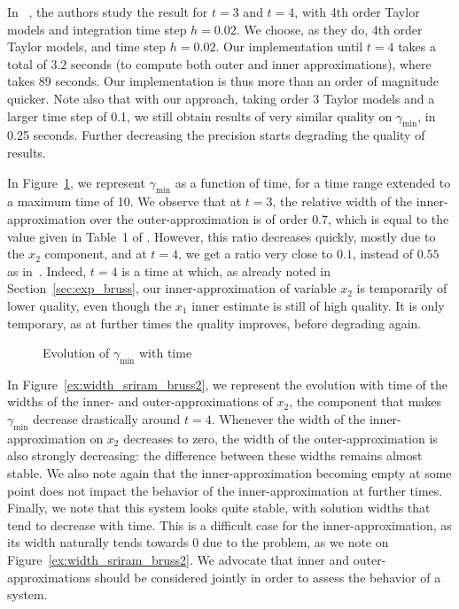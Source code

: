 \documentclass{sig-alternate-05-2015}
\begin{document}
In ~\cite{Underapproxflowpipes}, the authors study the result for $t=3$ and $t=4$, with 4th order Taylor models and integration time step $h=0.02$. 
We choose, as they do, 4th order Taylor models,  and time step $h=0.02$. Our implementation until $t=4$
takes a total of $3.2$ seconds (to compute both outer and inner approximations), where \cite{Underapproxflowpipes} takes 89 seconds.
Our implementation is thus more than an order of magnitude quicker.
Note also that with our approach, taking order 3 Taylor models and a larger time step of 0.1, we still obtain results of very similar quality on $\gamma_{\min}$, in 0.25 seconds. 
Further decreasing the precision starts degrading the quality of results. 



In Figure~\ref{ex:width_sriram_bruss1},  we represent $\gamma_{\min}$ as a function of time, for a  time range 
extended to a maximum time of 10. 
We observe that at $t=3$, the relative width of the inner-approximation over the
outer-approximation is of order $0.7$, which is equal to the value given in Table~1 of \cite{Underapproxflowpipes}. 
However, this ratio decreases quickly, mostly due to the $x_2$ component, and at $t=4$, we get a ratio very close to $0.1$,
instead of $0.55$ as in~\cite{Underapproxflowpipes}. Indeed, $t=4$ is a time at which, as already noted in Section~\ref{sec:exp_bruss}, our 
inner-approximation of variable $x_2$ is temporarily of lower quality, even though the $x_1$ inner estimate
is still of high quality. It is only temporary, as at further times the quality  improves, before degrading again. 
\begin{figure}[htbp]
\begin{center}
\end{center}
\caption{Evolution of $\gamma_{\min}$ with time \label{ex:width_sriram_bruss1} }
\end{figure}

In Figure~\ref{ex:width_sriram_bruss2}, we represent the evolution with time of the widths of the inner- and outer-approximations of $x_2$, 
the component that makes $\gamma_{\min}$ decrease drastically around $t=4$. Whenever the width of the inner-approximation on $x_2$ decreases 
to zero, the width of the outer-approximation is also strongly decreasing: the difference between these widths remains 
almost stable. We also note again that the inner-approximation becoming empty at some point does not impact the behavior of the inner-approximation 
at further times. Finally, we note that this system looks quite stable, with solution widths that tend to decrease with time. This is a
difficult case for the inner-approximation, as its width naturally tends towards 0 due to the problem, as we note on 
Figure~\ref{ex:width_sriram_bruss2}. We advocate that inner and outer-approximations should be considered jointly in order to assess 
the behavior of a system. 
\end{document}
